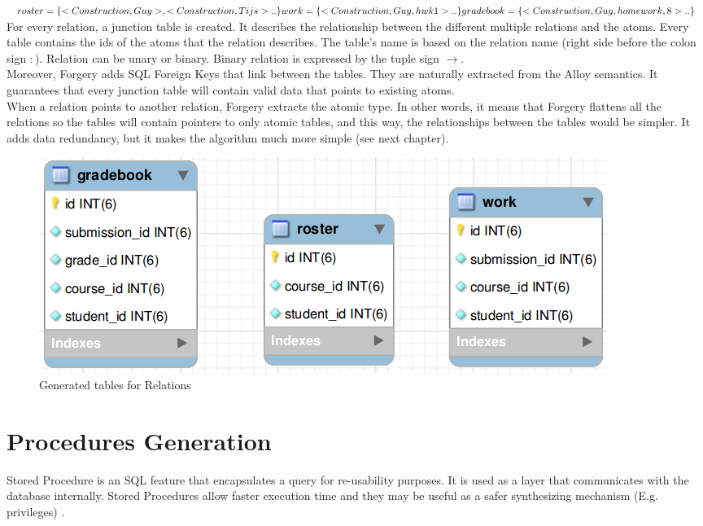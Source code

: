 \documentclass[oneside]{book}
\begin{document}
\noindent$roster = \{<Construction, Guy>, <Construction, Tijs>..\}\\
work = \{<Construction, Guy, hwk1>.. \}\\
gradebook = \{<Construction, Guy, homework, 8> ..\}$\\

\noindent For every relation, a junction table is created. It describes the relationship between the different multiple relations and the atoms.
Every table contains the ids of the atoms that the relation describes. The table's name is based on the relation name (right side before the colon sign $:$). Relation can be unary or binary. Binary relation is expressed by the tuple sign $\rightarrow$.\\

\noindent Moreover, Forgery adds SQL Foreign Keys that link between the tables. They are naturally extracted from the Alloy semantics. It guarantees that every junction table will contain valid data that points to existing atoms.\\

\noindent When a relation points to another relation, Forgery extracts the atomic type. In other words, it means that Forgery flattens all the relations so the tables will contain pointers to only atomic tables, and this way, the relationships between the tables would be simpler. It adds data redundancy, but it makes the algorithm much more simple (see next chapter).

\begin{figure}[h!]
\centering
\includegraphics[scale=0.5]{2}
\caption{Generated tables for Relations}
\end{figure}

\newpage
\section{Procedures Generation}

\noindent Stored Procedure is an SQL feature that encapsulates a query for re-usability purposes. It is used as a layer that communicates with the database internally. Stored Procedures allow faster execution time and they may be useful as a safer synthesizing mechanism (E.g. privileges) \cite{when}.\\
\end{document}
